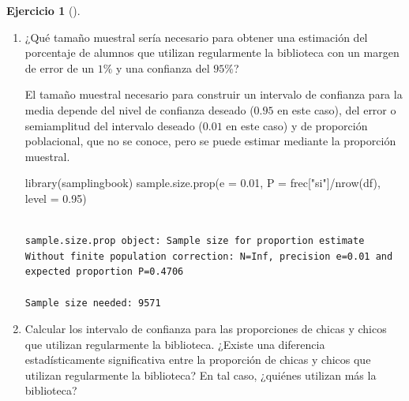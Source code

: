 \documentclass[
  a4paper,
]{scrreport}
\newenvironment{Shaded}{\begin{snugshade}}{\end{snugshade}}
\newcommand{\AttributeTok}[1]{\textcolor[rgb]{0.40,0.45,0.13}{#1}}
\newcommand{\FloatTok}[1]{\textcolor[rgb]{0.68,0.00,0.00}{#1}}
\newcommand{\FunctionTok}[1]{\textcolor[rgb]{0.28,0.35,0.67}{#1}}
\newcommand{\NormalTok}[1]{\textcolor[rgb]{0.00,0.23,0.31}{#1}}
\newcommand{\SpecialCharTok}[1]{\textcolor[rgb]{0.37,0.37,0.37}{#1}}
\newcommand{\StringTok}[1]{\textcolor[rgb]{0.13,0.47,0.30}{#1}}
\theoremstyle{definition}
\newtheorem{exercise}{Ejercicio}[chapter]
\theoremstyle{remark}
\begin{document}
\begin{exercise}[]
\begin{enumerate}
\begin{tcolorbox}
  \end{tcolorbox}
\item
  ¿Qué tamaño muestral sería necesario para obtener una estimación del
  porcentaje de alumnos que utilizan regularmente la biblioteca con un
  margen de error de un \(1\%\) y una confianza del \(95\%\)?

  \begin{tcolorbox}[enhanced jigsaw, toprule=.15mm, rightrule=.15mm, arc=.35mm, colback=white, colbacktitle=quarto-callout-tip-color!10!white, toptitle=1mm, left=2mm, colframe=quarto-callout-tip-color-frame, opacityback=0, breakable, opacitybacktitle=0.6, bottomtitle=1mm, titlerule=0mm, title=\textcolor{quarto-callout-tip-color}{\faLightbulb}\hspace{0.5em}{Solución}, bottomrule=.15mm, coltitle=black, leftrule=.75mm]

  El tamaño muestral necesario para construir un intervalo de confianza
  para la media depende del nivel de confianza deseado (\(0.95\) en este
  caso), del error o semiamplitud del intervalo deseado (\(0.01\) en
  este caso) y de proporción poblacional, que no se conoce, pero se
  puede estimar mediante la proporción muestral.

\begin{Shaded}
\begin{Highlighting}[]
\FunctionTok{library}\NormalTok{(samplingbook)}
\FunctionTok{sample.size.prop}\NormalTok{(}\AttributeTok{e =} \FloatTok{0.01}\NormalTok{, }\AttributeTok{P =}\NormalTok{ frec[}\StringTok{"si"}\NormalTok{]}\SpecialCharTok{/}\FunctionTok{nrow}\NormalTok{(df), }\AttributeTok{level =} \FloatTok{0.95}\NormalTok{)}
\end{Highlighting}
\end{Shaded}

\begin{verbatim}

sample.size.prop object: Sample size for proportion estimate
Without finite population correction: N=Inf, precision e=0.01 and expected proportion P=0.4706

Sample size needed: 9571
\end{verbatim}

  \end{tcolorbox}
\item
  Calcular los intervalo de confianza para las proporciones de chicas y
  chicos que utilizan regularmente la biblioteca. ¿Existe una diferencia
  estadísticamente significativa entre la proporción de chicas y chicos
  que utilizan regularmente la biblioteca? En tal caso, ¿quiénes
  utilizan más la biblioteca?


\end{enumerate}
\end{exercise}
\end{document}
